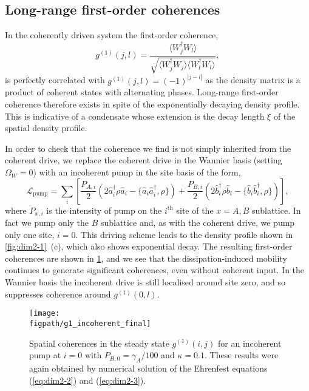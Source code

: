 \subsection{Long-range first-order coherences}
In the coherently driven system the first-order coherence,
\begin{equation}
	g^{(1)}(j,l) = \frac{\langle W_{j}^{\dagger}W_{l} \rangle}{\sqrt{\langle W_{j}^{\dagger}W_{j} \rangle \langle W_{l}^{\dagger}W_{l} \rangle}},
	\label{eq:dim2-5}
\end{equation}
is perfectly correlated with \(g^{(1)}(j,l) = (-1)^{|j-l|}\) as the density matrix is a product of coherent states with alternating phases. Long-range first-order coherence therefore exists in spite of the exponentially decaying density profile. This is indicative of a condensate whose extension is the decay length \(\xi\) of the spatial density profile. 

In order to check that the coherence we find is not simply inherited from the coherent drive, we replace the coherent drive in the Wannier basis (setting \(\Omega_{W} = 0\)) with an incoherent pump in the site basis of the form,
\begin{equation}
	\mathcal{L}_{\mathrm{pump}} = \sum_{i}\left[\frac{P_{A,i}}{2}\left(2\hat{a}_{i}^{\dagger}\rho\hat{a}_{i} - \{\hat{a}_{i}\hat{a}_{i}^{\dagger}, \rho\}\right) + \frac{P_{B,i}}{2}\left(2\hat{b}_{i}^{\dagger}\rho\hat{b}_{i} - \{\hat{b}_{i}\hat{b}_{i}^{\dagger}, \rho\}\right) \right],
	\label{eq:dim2-6}
\end{equation}
where \(P_{x,i}\) is the intensity of pump on the \(i^{\mathrm{th}}\) site of the \(x = A,B\) sublattice. In fact we pump only the \(B\) sublattice and, as with the coherent drive, we pump only one site, \(i=0\). This driving scheme leads to the density profile shown in \cref{fig:dim2-1}~(c), which also shows exponential decay. The resulting first-order coherences are shown in \cref{fig:dim2-3}, and we see that the dissipation-induced mobility continues to generate significant coherences, even without coherent input. In the Wannier basis the incoherent drive is still localised around site zero, and so suppresses coherence around \(g^{(1)}(0,l)\). 

\begin{figure}[ht!]
\centering 
\texttt{[image: \\figpath/g1\_incoherent\_final]}
\caption{\label{fig:dim2-3}Spatial coherences in the steady state \(g^{(1)}(i,j)\) for an incoherent pump at \(i=0\) with \(P_{B,0} = \gamma_{A}/100\) and \(\kappa = 0.1\). These results were again obtained by numerical solution of the Ehrenfest equations (\ref{eq:dim2-2}) and (\ref{eq:dim2-3}).}
\end{figure}

